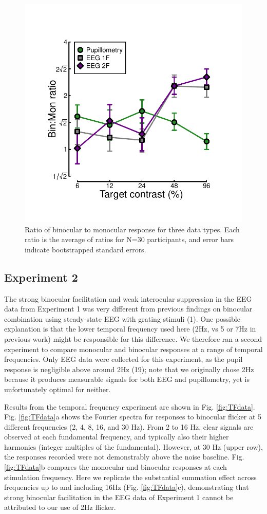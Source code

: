\documentclass[
]{article}
\begin{document}
\begin{figure}

{\centering \includegraphics[width=0.5\linewidth]{Figures/BSratios} 

}

\caption{Ratio of binocular to monocular response for three data types. Each ratio is the average of ratios for N=30 participants, and error bars indicate bootstrapped standard errors.}\label{fig:BSratios}
\end{figure}

\hypertarget{experiment-2}{%
\subsection{Experiment 2}\label{experiment-2}}

The strong binocular facilitation and weak interocular suppression in the EEG data from Experiment 1 was very different from previous findings on binocular combination using steady-state EEG with grating stimuli (1). One possible explanation is that the lower temporal frequency used here (2Hz, vs 5 or 7Hz in previous work) might be responsible for this difference. We therefore ran a second experiment to compare monocular and binocular responses at a range of temporal frequencies. Only EEG data were collected for this experiment, as the pupil response is negligible above around 2Hz (19); note that we originally chose 2Hz because it produces measurable signals for both EEG and pupillometry, yet is unfortunately optimal for neither.

Results from the temporal frequency experiment are shown in Fig. \ref{fig:TFdata}. Fig. \ref{fig:TFdata}a shows the Fourier spectra for responses to binocular flicker at 5 different frequencies (2, 4, 8, 16, and 30 Hz). From 2 to 16 Hz, clear signals are observed at each fundamental frequency, and typically also their higher harmonics (integer multiples of the fundamental). However, at 30 Hz (upper row), the responses recorded were not demonstrably above the noise baseline. Fig. \ref{fig:TFdata}b compares the monocular and binocular responses at each stimulation frequency. Here we replicate the substantial summation effect across frequencies up to and including 16Hz (Fig. \ref{fig:TFdata}c), demonstrating that strong binocular facilitation in the EEG data of Experiment 1 cannot be attributed to our use of 2Hz flicker.
\end{document}
